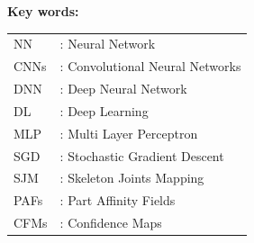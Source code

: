 \newpage
\thispagestyle{abstract}
\begin{center}
{}
\end{center}



\textbf{Key words:} 

\newpage
{}
{\fontsize{12pt}{5pt}\selectfont
\tableofcontents}


\newpage
{}
\listoffigures


\newpage
{}
\listoftables


\newpage
\thispagestyle{danhmucviettat}
{}

\FloatBarrier
\begin{table}[h]
\centering
\captionsetup{list=no}
\begin{center}
\begin{tabularx}{\columnwidth}{XX}
NN & : Neural Network \\
CNNs & : Convolutional Neural Networks\\
DNN & : Deep Neural Network \\
DL & : Deep Learning \\
MLP & : Multi Layer Perceptron \\
SGD & : Stochastic Gradient Descent \\
SJM & : Skeleton Joints Mapping \\
PAFs & : Part Affinity Fields  \\
CFMs & : Confidence Maps

\end{tabularx}
\end{center}
\end{table}
\FloatBarrier